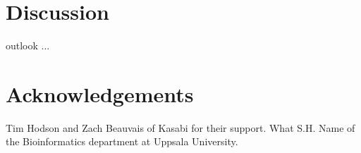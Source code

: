 \documentclass[sw]{iosart2c}
\begin{document}
\section{Discussion}

outlook ...

\section{Acknowledgements}

Tim Hodson and Zach Beauvais of Kasabi for their support. What S.H. Name of the Bioinformatics department at Uppsala University.



%
%
%
\end{document}
